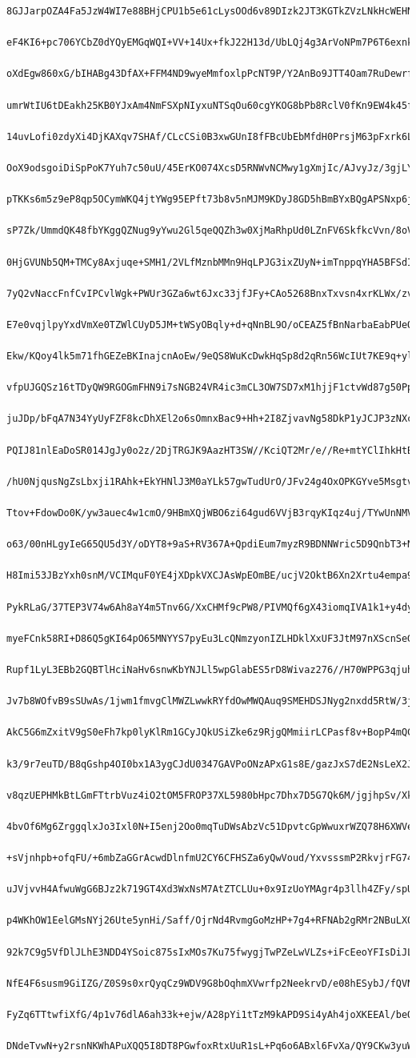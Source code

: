 \documentclass[
    article,            %
    11pt,               %
    oneside,            %
    a4paper,            %
    english,            %
    brazil,             %
    sumario=tradicional,
    ]{abntex2}
\begin{document}
\begin{Verbatim}[frame=single, commandchars=\\\{\}, fontsize=\footnotesize]
    8GJJarpOZA4Fa5JzW4WI7e88BHjCPU1b5e61cLysOOd6v89DIzk2JT3KGTkZVzLNkHcWEHNm
    eF4KI6+pc706YCbZ0dYQyEMGqWQI+VV+14Ux+fkJ22H13d/UbLQj4g3ArVoNPm7P6T6exnkG
    oXdEgw860xG/bIHABg43DfAX+FFM4ND9wyeMmfoxlpPcNT9P/Y2AnBo9JTT4Oam7RuDewrft
    umrWtIU6tDEakh25KB0YJxAm4NmFSXpNIyxuNTSqOu60cgYKOG8bPb8RclV0fKn9EW4k45fp
    14uvLofi0zdyXi4DjKAXqv7SHAf/CLcCSi0B3xwGUnI8fFBcUbEbMfdH0PrsjM63pFxrk6LE
    OoX9odsgoiDiSpPoK7Yuh7c50uU/45ErKO074XcsD5RNWvNCMwy1gXmjIc/AJvyJz/3gjLYD
    pTKKs6m5z9eP8qp5OCymWKQ4jtYWg95EPft73b8v5nMJM9KDyJ8GD5hBmBYxBQgAPSNxp6jn
    sP7Zk/UmmdQK48fbYKggQZNug9yYwu2Gl5qeQQZh3w0XjMaRhpUd0LZnFV6SkfkcVvn/8oVo
    0HjGVUNb5QM+TMCy8Axjuqe+SMH1/2VLfMznbMMn9HqLPJG3ixZUyN+imTnppqYHA5BFSdI5
    7yQ2vNaccFnfCvIPCvlWgk+PWUr3GZa6wt6Jxc33jfJFy+CAo5268BnxTxvsn4xrKLWx/zvq
    E7e0vqjlpyYxdVmXe0TZWlCUyD5JM+tWSyOBqly+d+qNnBL9O/oCEAZ5fBnNarbaEabPUeQr
    Ekw/KQoy4lk5m71fhGEZeBKInajcnAoEw/9eQS8WuKcDwkHqSp8d2qRn56WcIUt7KE9q+yl0
    vfpUJGQSz16tTDyQW9RGOGmFHN9i7sNGB24VR4ic3mCL3OW7SD7xM1hjjF1ctvWd87g50Pp5
    juJDp/bFqA7N34YyUyFZF8kcDhXEl2o6sOmnxBac9+Hh+2I8ZjvavNg58DkP1yJCJP3zNXce
    PQIJ81nlEaDoSR014JgJy0o2z/2DjTRGJK9AazHT3SW//KciQT2Mr/e//Re+mtYClIhkHtBD
    /hU0NjqusNgZsLbxji1RAhk+EkYHNlJ3M0aYLk57gwTudUrO/JFv24g4OxOPKGYve5MsgtvA
    Ttov+FdowDo0K/yw3auec4w1cmO/9HBmXQjWBO6zi64gud6VVjB3rqyKIqz4uj/TYwUnNMVS
    o63/00nHLgyIeG65QU5d3Y/oDYT8+9aS+RV367A+QpdiEum7myzR9BDNNWric5D9QnbT3+NA
    H8Imi53JBzYxh0snM/VCIMquF0YE4jXDpkVXCJAsWpEOmBE/ucjV2OktB6Xn2Xrtu4empa97
    PykRLaG/37TEP3V74w6Ah8aY4m5Tnv6G/XxCHMf9cPW8/PIVMQf6gX43iomqIVA1k1+y4dyL
    myeFCnk58RI+D86Q5gKI64pO65MNYYS7pyEu3LcQNmzyonIZLHDklXxUF3JtM97nXScnSeGX
    Rupf1LyL3EBb2GQBTlHciNaHv6snwKbYNJLl5wpGlabES5rD8Wivaz276//H70WPPG3qjuhR
    Jv7b8WOfvB9sSUwAs/1jwm1fmvgClMWZLwwkRYfdOwMWQAuq9SMEHDSJNyg2nxdd5RtW/3jm
    AkC5G6mZxitV9gS0eFh7kp0lyKlRm1GCyJQkUSiZke6z9RjgQMmiirLCPasf8v+BopP4mQCw
    k3/9r7euTD/B8qGshp4OI0bx1A3ygCJdU0347GAVPoONzAPxG1s8E/gazJxS7dE2NsLeX2JQ
    v8qzUEPHMkBtLGmFTtrbVuz4iO2tOM5FROP37XL5980bHpc7Dhx7D5G7Qk6M/jgjhpSv/Xk0
    4bvOf6Mg6ZrggqlxJo3Ixl0N+I5enj2Oo0mqTuDWsAbzVc51DpvtcGpWwuxrWZQ78H6XWVec
    +sVjnhpb+ofqFU/+6mbZaGGrAcwdDlnfmU2CY6CFHSZa6yQwVoud/YxvsssmP2RkvjrFG74S
    uJVjvvH4AfwuWgG6BJz2k719GT4Xd3WxNsM7AtZTCLUu+0x9IzUoYMAgr4p3llh4ZFy/spUN
    p4WKhOW1EelGMsNYj26Ute5ynHi/Saff/OjrNd4RvmgGoMzHP+7g4+RFNAb2gRMr2NBuLX0r
    92k7C9g5VfDlJLhE3NDD4YSoic875sIxMOs7Ku75fwygjTwPZeLwVLZs+iFcEeoYFIsDiJLC
    NfE4F6susm9GiIZG/Z0S9s0xrQyqCz9WDV9G8bOqhmXVwrfp2NeekrvD/e08hESybJ/fQVNs
    FyZq6TTtwfiXfG/4p1v76dlA6ah33k+ejw/A28pYi1tTzM9kAPD9Si4yAh4joXKEEAl/beQh
    DNdeTvwN+y2rsnNKWhAPuXQQ5I8DT8PGwfoxRtxUuR1sL+Pq6o6ABxl6FvXa/QY9CKw3yuW/

\end{Verbatim}
\end{document}
